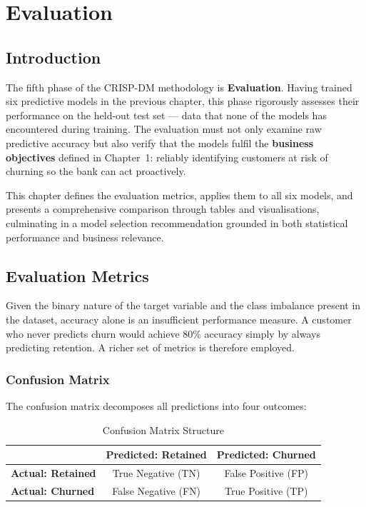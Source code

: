 \chapter{Evaluation}

\section{Introduction}

The fifth phase of the CRISP-DM methodology is \textbf{Evaluation}. Having trained six predictive models in the previous chapter, this phase rigorously assesses their performance on the held-out test set — data that none of the models has encountered during training. The evaluation must not only examine raw predictive accuracy but also verify that the models fulfil the \textbf{business objectives} defined in Chapter~1: reliably identifying customers at risk of churning so the bank can act proactively.

This chapter defines the evaluation metrics, applies them to all six models, and presents a comprehensive comparison through tables and visualisations, culminating in a model selection recommendation grounded in both statistical performance and business relevance.

\section{Evaluation Metrics}

Given the binary nature of the target variable and the class imbalance present in the dataset, accuracy alone is an insufficient performance measure. A customer who never predicts churn would achieve 80\% accuracy simply by always predicting retention. A richer set of metrics is therefore employed.

\subsection{Confusion Matrix}

The confusion matrix decomposes all predictions into four outcomes:

\begin{table}[H]
    \centering
    \caption{Confusion Matrix Structure}
    \label{tab:confusion_structure}
    \vspace{3mm}
    \begin{tabular}{|l|c|c|}
        \hline
        & \textbf{Predicted: Retained} & \textbf{Predicted: Churned} \\
        \hline
        \textbf{Actual: Retained} & True Negative (TN) & False Positive (FP) \\
        \hline
        \textbf{Actual: Churned} & False Negative (FN) & True Positive (TP) \\
        \hline
    \end{tabular}
\end{table}

